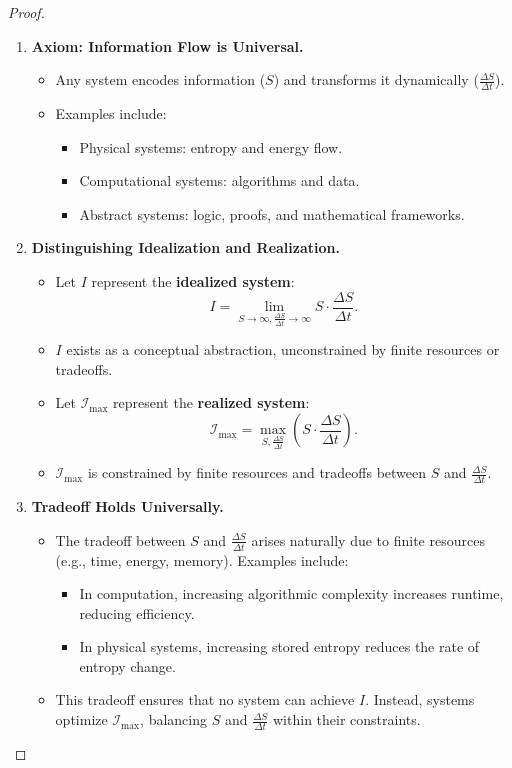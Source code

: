 \documentclass[12pt]{article}
\begin{document}
\begin{proof}
\begin{enumerate}
    \item \textbf{Axiom: Information Flow is Universal.}
    \begin{itemize}
        \item Any system encodes information (\(S\)) and transforms it dynamically (\(\frac{\Delta S}{\Delta t}\)).
        \item Examples include:
        \begin{itemize}
            \item Physical systems: entropy and energy flow.
            \item Computational systems: algorithms and data.
            \item Abstract systems: logic, proofs, and mathematical frameworks.
        \end{itemize}
    \end{itemize}

    \item \textbf{Distinguishing Idealization and Realization.}
    \begin{itemize}
        \item Let \(I\) represent the \textbf{idealized system}:
        \[
        I = \lim_{S \to \infty, \frac{\Delta S}{\Delta t} \to \infty} S \cdot \frac{\Delta S}{\Delta t}.
        \]
        \item \(I\) exists as a conceptual abstraction, unconstrained by finite resources or tradeoffs.
        \item Let \(\mathcal{I}_{\text{max}}\) represent the \textbf{realized system}:
        \[
        \mathcal{I}_{\text{max}} = \max_{S, \frac{\Delta S}{\Delta t}} \left(S \cdot \frac{\Delta S}{\Delta t}\right).
        \]
        \item \(\mathcal{I}_{\text{max}}\) is constrained by finite resources and tradeoffs between \(S\) and \(\frac{\Delta S}{\Delta t}\).
    \end{itemize}

    \item \textbf{Tradeoff Holds Universally.}
    \begin{itemize}
        \item The tradeoff between \(S\) and \(\frac{\Delta S}{\Delta t}\) arises naturally due to finite resources (e.g., time, energy, memory). Examples include:
        \begin{itemize}
            \item In computation, increasing algorithmic complexity increases runtime, reducing efficiency.
            \item In physical systems, increasing stored entropy reduces the rate of entropy change.
        \end{itemize}
        \item This tradeoff ensures that no system can achieve \(I\). Instead, systems optimize \(\mathcal{I}_{\text{max}}\), balancing \(S\) and \(\frac{\Delta S}{\Delta t}\) within their constraints.
    \end{itemize}


\end{enumerate}
\end{proof}
\end{document}
